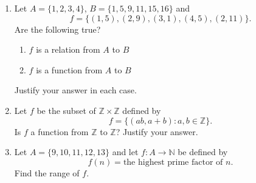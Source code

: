 \documentclass[11pt]{article}
\begin{document}
\begin{enumerate}
\item Let $A=\{1,2,3,4\}$, $B=\{1,5,9,11,15,16\}$ and
\[
f=\{(1,5),(2,9),(3,1),(4,5),(2,11)\}.
\]
Are the following true?
\begin{enumerate}
\item $f$ is a relation from $A$ to $B$
\item $f$ is a function from $A$ to $B$
\end{enumerate}
Justify your answer in each case.

\item Let $f$ be the subset of $\mathbb{Z}\times\mathbb{Z}$ defined by
\[
f=\{(ab,a+b):a,b\in\mathbb{Z}\}.
\]
Is $f$ a function from $\mathbb{Z}$ to $\mathbb{Z}$? Justify your answer.

\item Let $A=\{9,10,11,12,13\}$ and let $f:A\to\mathbb{N}$ be defined by
\[
f(n)=\text{the highest prime factor of }n.
\]
Find the range of $f$.

\end{enumerate}
\end{document}
